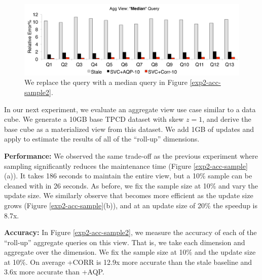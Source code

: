 
\begin{figure}[t]
\centering
  \includegraphics[scale=0.15]{exp/msdc_5.pdf}
 \caption{We replace the \sumfunc query with a median query in Figure \ref{exp2-acc-sample2}. \label{exp2-median} }
\end{figure}

In our next experiment, we evaluate an aggregate view use case similar to a data cube.
We generate a 10GB base TPCD dataset with skew $z=1$, and derive the base cube as a materialized view from this dataset.
We add 1GB of updates and apply \svc to estimate the results of all of the ``roll-up'' dimensions.

\textbf{Performance: }
We observed the same trade-off as the previous experiment where sampling significantly reduces the maintenance time (Figure \ref{exp2-acc-sample}(a)).
It takes 186 seconds to maintain the entire view, but a 10\% sample can be cleaned with \svc in 26 seconds.
As before, we fix the sample size at 10\% and vary the update size.
We similarly observe that \svc becomes more efficient as the update size grows (Figure \ref{exp2-acc-sample}(b)), and at an update size of 20\%  the speedup is 8.7x.

\textbf{Accuracy: }
In Figure \ref{exp2-acc-sample2}, we measure the accuracy of each of the ``roll-up'' aggregate queries on this view.
That is, we take each dimension and aggregate over the dimension.
We fix the sample size at 10\% and the update size at 10\%.
On average \svcnospace+CORR is 12.9x more accurate than the stale baseline and 3.6x more accurate than \svcnospace+AQP. 

